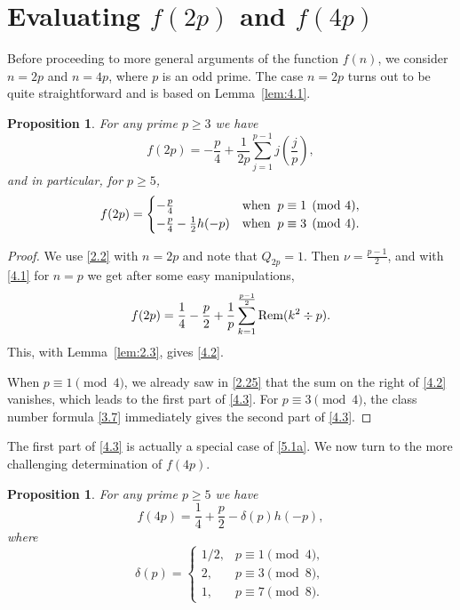 \documentclass{amsart}
\theoremstyle{plain}
\newtheorem{proposition}[theorem]{Proposition}
\numberwithin{equation}{section}
\begin{document}
\section{Evaluating $f(2p)$ and $f(4p)$}\label{sec:5}

Before proceeding to more general arguments of the function $f(n)$, we consider
$n=2p$ and $n=4p$, where $p$ is an odd prime. The case $n=2p$ turns out to be
quite straightforward and is based on Lemma~\ref{lem:4.1}.

\begin{proposition}\label{prop:4.2}
For any prime $p\geq 3$ we have
\begin{equation}\label{4.2}
f(2p)= -\frac{p}{4} + \frac{1}{2p}\sum_{j=1}^{p-1}j\left(\frac{j}{p}\right),
\end{equation}
and in particular, for $p\geq 5$, 
\begin{equation}\label{4.3}
f(2p)=\begin{cases}
-\frac{p}{4} &\hbox{when}\;\;p\equiv 1\pmod{4},\\
-\frac{p}{4}-\frac{1}{2}h(-p) &\hbox{when}\;\;p\equiv 3\pmod{4}.
\end{cases}
\end{equation}
\end{proposition}

\begin{proof}
We use \eqref{2.2} with $n=2p$ and note that $Q_{2p}=1$. Then 
$\nu=\frac{p-1}{2}$, and with \eqref{4.1} for $n=p$ we get after some easy 
manipulations,
\[
f(2p)=\frac{1}{4}-\frac{p}{2}
+\frac{1}{p}\sum_{k=1}^{\frac{p-1}{2}}{\rm Rem}(k^2\div p).
\]
This, with Lemma~\ref{lem:2.3}, gives \eqref{4.2}.

When $p\equiv 1\pmod{4}$, we already saw in \eqref{2.25} that the sum on the 
right of \eqref{4.2} vanishes, which leads to the first part of \eqref{4.3}. For
$p\equiv 3\pmod{4}$, the class number formula \eqref{3.7} immediately gives the
second part of \eqref{4.3}.
\end{proof}

The first part of \eqref{4.3} is actually a special case of \eqref{5.1a}.
We now turn to the more challenging determination of $f(4p)$.

\begin{proposition}\label{prop:4.3}
For any prime $p\geq 5$ we have
\begin{equation}\label{4.4}
f(4p)= \frac{1}{4} + \frac{p}{2} -\delta(p)h(-p),
\end{equation}
where 
\[
\delta(p)=\begin{cases}
1/2, & p\equiv 1\pmod{4},\\
2, & p\equiv 3\pmod{8},\\
1, & p\equiv 7\pmod{8}.
\end{cases}
\]
\end{proposition}
\end{document}
